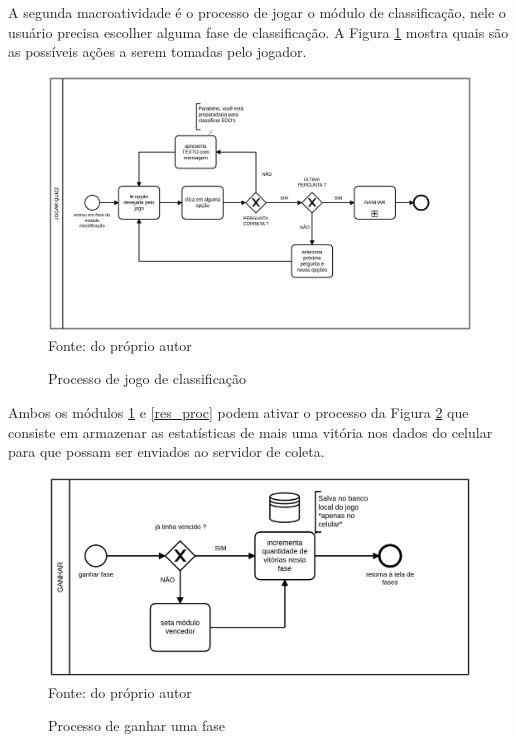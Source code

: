 A segunda macro\-atividade é o processo de jogar o módulo de classificação, nele o usuário precisa escolher alguma fase de classificação. A Figura \ref{class_proc} mostra quais são as possíveis ações a serem tomadas pelo jogador.

\begin{figure}[H]
\centering
\caption{Processo de jogo de classificação}
\includegraphics[scale=0.15]{figuras/processos/processo_classificacao.png}
\label{class_proc}
\small{Fonte: do próprio autor}
\end{figure}

Ambos os módulos \ref{class_proc} e \ref{res_proc} podem ativar o processo da Figura \ref{ganhar_proc} que consiste em armazenar as estatísticas de mais uma vitória nos dados do celular para que possam ser enviados ao servidor de coleta.


\begin{figure}[H]
\centering
\caption{Processo de ganhar uma fase}
\includegraphics[scale=0.23]{figuras/processos/processo_ganhar.png}
\label{ganhar_proc}
\small{Fonte: do próprio autor}
\end{figure}


